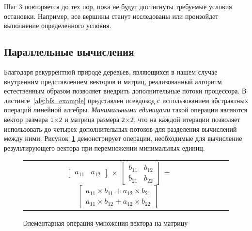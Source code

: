 Шаг 3 повторяется до тех пор, пока не будут достигнуты требуемые условия остановки. Например, все вершины станут исследованы или произойдет выполнение определенного условия.



\subsection{Параллельные вычисления}
Благодаря рекуррентной природе деревьев, являющихся в нашем случае внутренним представлением векторов и матриц, реализованный алгоритм естественным образом позволяет внедрить дополнительные потоки процессора. В листинге~\ref{alg:bfs_example} представлен псевдокод с использованием абстрактных операций линейной алгебры. \textit{Минимальными единицами} такой операции являются вектор размера \texttt{1$\times$2} и матрица размера \texttt{2$\times$2}, что на каждой итерации позволяет использовать до четырех дополнительных потоков для разделения вычислений между ними. Рисунок~\ref{ab_product} демонстрирует операции, необходимые для вычисление результирующего вектора при перемножении минимальных единиц. 

\begin{figure}[h]
\begin{center}
    \begin{tabular}{ccc}
        $\begin{bmatrix} a_{11} & a_{12} \end{bmatrix}$
        $\times$
        $\begin{bmatrix} b_{11} & b_{12} \\ b_{21} & b_{22} \end{bmatrix}$
        =
        $\begin{bmatrix} a_{11} \times b_{11} + a_{12} \times b_{21} \\ a_{11} \times b_{12} + a_{12} \times b_{22} \end{bmatrix}$
    \end{tabular}
\end{center}
\caption{Элементарная операция умножения вектора на матрицу}
\label{ab_product}
\end{figure}
\lstset{style=codelistingstyle}

